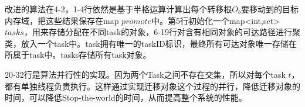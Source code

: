 

改进的算法在4-2，1-4行依然是基于半格运算计算出每个转移根$O_b$要移动到的目标内存域，把这些结果保存在map $promote$中。第5行初始化一个map<int,set> $tasks$，用来存储分配在不同task的对象，6-19行对含有相同对象的可达路径进行聚类，放入一个task中。task拥有唯一的taskID标识，最终所有可达对象唯一存储在所属于task中。tasks存储所有task对象。

20-32行是算法并行性的实现。因为两个Task之间不存在交集，所以对每个task $t$，都有单独线程负责执行。这样通过实现迁移对象这个过程的并行，降低迁移对象的时间，可以降低Stop-the-world的时间，从而提高整个系统的性能。




